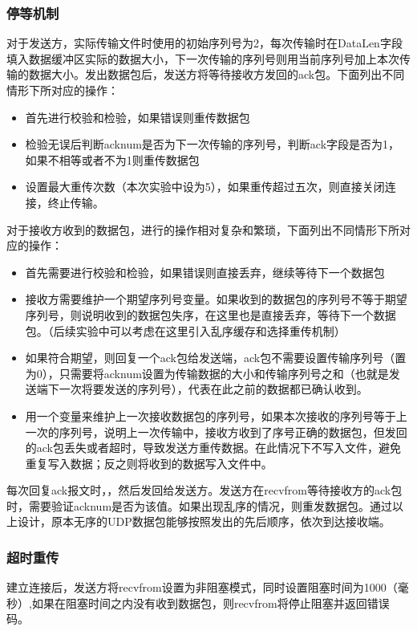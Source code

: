 \documentclass[UTF8,a4paper,10pt]{ctexart}
\begin{document}
\subsubsection{停等机制}
对于发送方，实际传输文件时使用的初始序列号为2，每次传输时在DataLen字段填入数据缓冲区实际的数据大小，下一次传输的序列号则用当前序列号加上本次传输的数据大小。发出数据包后，发送方将等待接收方发回的ack包。下面列出不同情形下所对应的操作：
\begin{itemize}
    \item 首先进行校验和检验，如果错误则重传数据包
    \item 检验无误后判断acknum是否为下一次传输的序列号，判断ack字段是否为1，如果不相等或者不为1则重传数据包
    \item 设置最大重传次数（本次实验中设为5），如果重传超过五次，则直接关闭连接，终止传输。
\end{itemize}\par
\vspace{1cm}
对于接收方收到的数据包，进行的操作相对复杂和繁琐，下面列出不同情形下所对应的操作：
\begin{itemize}
    \item 首先需要进行校验和检验，如果错误则直接丢弃，继续等待下一个数据包
    \item 接收方需要维护一个期望序列号变量。如果收到的数据包的序列号不等于期望序列号，则说明收到的数据包失序，在这里也是直接丢弃，等待下一个数据包。（后续实验中可以考虑在这里引入乱序缓存和选择重传机制）
    \item 如果符合期望，则回复一个ack包给发送端，ack包不需要设置传输序列号（置为0），只需要将acknum设置为传输数据的大小和传输序列号之和（也就是发送端下一次将要发送的序列号），代表在此之前的数据都已确认收到。
    \item 用一个变量来维护上一次接收数据包的序列号，如果本次接收的序列号等于上一次的序列号，说明上一次传输中，接收方收到了序号正确的数据包，但发回的ack包丢失或者超时，导致发送方重传数据。在此情况下不写入文件，避免重复写入数据；反之则将收到的数据写入文件中。
\end{itemize}\par
每次回复ack报文时，，然后发回给发送方。发送方在recvfrom等待接收方的ack包时，需要验证acknum是否为该值。如果出现乱序的情况，则重发数据包。通过以上设计，原本无序的UDP数据包能够按照发出的先后顺序，依次到达接收端。

\subsubsection{超时重传}
建立连接后，发送方将recvfrom设置为非阻塞模式，同时设置阻塞时间为1000（毫秒）,如果在阻塞时间之内没有收到数据包，则recvfrom将停止阻塞并返回错误码。
\end{document}
